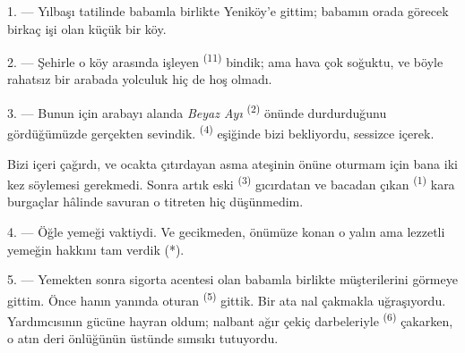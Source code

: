 

\VUsaut{4.0mm}
\VUsaut{3.0mm}
\VUfilet{16mm}
\VUsaut{5.6mm}
\VUsaut{3.0mm}

\VUsaut{3.0mm}

\VUsaut{4.0mm}

1. --- Yılbaşı tatilinde babamla birlikte Yeniköy'e gittim; babamın orada
görecek birkaç işi olan küçük bir köy.

2. --- Şehirle o köy arasında işleyen 
\textsuperscript{(11)} bindik; ama hava çok soğuktu, ve böyle rahatsız bir
arabada yolculuk hiç de hoş olmadı.

3. --- Bunun için  arabayı alanda \textit{Beyaz Ayı}
 \textsuperscript{(2)} önünde durdurduğunu gördüğümüzde
gerçekten sevindik.  \textsuperscript{(4)} eşiğinde bizi
bekliyordu, sessizce  içerek.

Bizi içeri çağırdı, ve ocakta çıtırdayan asma ateşinin önüne oturmam için bana
iki kez söylemesi gerekmedi. Sonra artık eski 
\textsuperscript{(3)} gıcırdatan ve bacadan çıkan 
\textsuperscript{(1)} kara burgaçlar hâlinde savuran o titreten
 hiç düşünmedim.

4. --- Öğle yemeği vaktiydi. Ve gecikmeden, önümüze konan o yalın ama lezzetli
yemeğin hakkını tam verdik (*).

\VUsaut{3.0mm}

5. --- Yemekten sonra sigorta acentesi olan babamla birlikte müşterilerini
görmeye gittim. Önce hanın yanında oturan 
\textsuperscript{(5)} gittik. Bir ata nal çakmakla uğraşıyordu. Yardımcısının
gücüne hayran oldum; nalbant ağır çekiç darbeleriyle 
\textsuperscript{(6)} çakarken, o atın  deri önlüğünün
üstünde sımsıkı tutuyordu.

